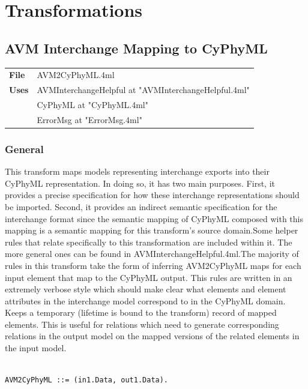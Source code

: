 \section{Transformations}

\subsection{AVM Interchange Mapping to CyPhyML}

\begin{tabular}{ l l }
\textbf{File} & AVM2CyPhyML.4ml \\
\textbf{Uses} & AVMInterchangeHelpful at "AVMInterchangeHelpful.4ml" \\
& CyPhyML at "CyPhyML.4ml" \\
& ErrorMsg at "ErrorMsg.4ml" \\
\end{tabular}


\subsubsection{General}


This transform maps models representing interchange exports into their CyPhyML representation. In doing so, it has two main purposes. First, it provides a precise specification for how these interchange representations should be imported. Second, it provides an indirect semantic specification for the interchange format since the semantic mapping of CyPhyML composed with this mapping is a semantic mapping for this transform's source domain.Some helper rules that relate specifically to this transformation are included within it. The more general ones can be found in AVMInterchangeHelpful.4ml.The majority of rules in this transform take the form of inferring AVM2CyPhyML maps for each input element that map to the CyPhyML output. This rules are written in an extremely verbose style which should make clear what elements and element attributes in the interchange model correspond to in the CyPhyML domain.
Keeps a temporary (lifetime is bound to the transform) record of mapped elements. This is useful for relations which need to generate corresponding relations in the output model on the mapped versions of the related elements in the input model.
\begin{lstlisting}

AVM2CyPhyML ::= (in1.Data, out1.Data).

\end{lstlisting}


